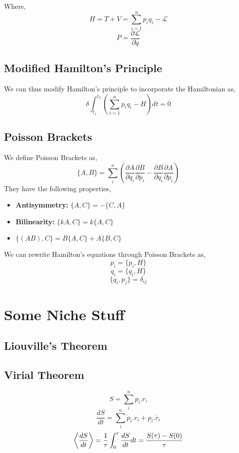 	Where,
	$$H = T + V = \sum_{i = 1}^{n} p_{i}q_{i} - \mathcal{L}$$
	$$P = \frac{\partial \mathcal{L}}{\partial \dot{q}}$$
\subsection{Modified Hamilton's Principle}
We can thus modify Hamilton's principle to incorporate the Hamiltonian as,
\begin{equation}
\delta \int_{t_{1}}^{t_{2}} \left(\sum_{i = 1}^{n} p_{i}q_{i} - H \right) dt = 0 
\end{equation}
\subsection{Poisson Brackets}
We define Poisson Brackets as,
		\begin{equation}
		\{A, B\} = \sum_{i}^{n} \left( \frac{\partial A}{\partial q_{i}} \frac{\partial B}{\partial p_{i}} -  \frac{\partial B}{\partial q_{i}} \frac{\partial A}{\partial p_{i}}\right)
		\end{equation}
		They have the following properties,
		\begin{itemize}
		\item \textbf{Antisymmetry:} $\{A, C\} = -  \{C, A\}$
		\item \textbf{Bilinearity:} $\{kA, C\} = k \{A, C\}$
		\item $\{\left(AB\right), C\} = B\{A,C\} + A\{B,C\}$
		\end{itemize}
		
		We can rewrite Hamilton's equations through Poisson Brackets as,
		\begin{equation}
		\dot{p}_{i} = \{p_{i}, H\}
		\end{equation}
		\begin{equation}
		\dot{q}_{i} = \{q_{i}, H\}
		\end{equation}
		\begin{equation}
			\{q_{i}, p_{j}\} = \delta_{ij}
		\end{equation}
\section{Some Niche Stuff}
\subsection{Liouville's Theorem}
\subsection{Virial Theorem}
\begin{equation}
	S= \sum_{i}^{n} p_{i} . r_{i}
	\end{equation}
	\begin{equation}
	\frac{d S}{d t} = \sum_{i}^{n} \dot{p}_{i} . r_{i} + p_{i} . \dot{r}_{i}
	\end{equation}
	\begin{equation}
	\expectationvalue{\frac{d S}{d t}} = \frac{1}{\tau} \int_{0}^{r} \frac{d S}{d t} dt = \frac{S(\tau) - S(0)}{\tau}
	\end{equation}
	
